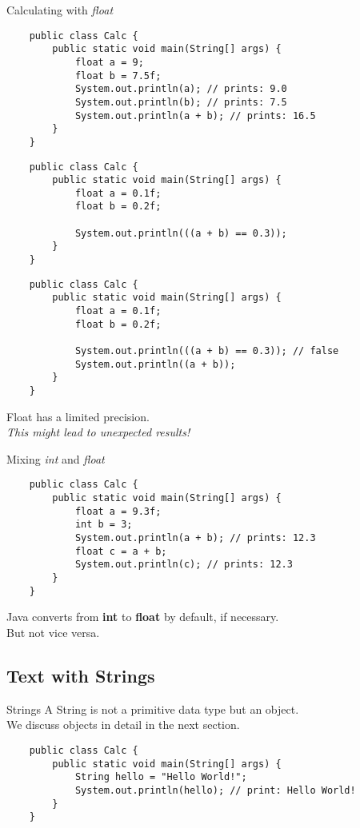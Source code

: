 \begin{frame}{Calculating with \emph{float}}
	\begin{lstlisting}
	public class Calc {
	    public static void main(String[] args) {
	        float a = 9;
	        float b = 7.5f;
	        System.out.println(a); // prints: 9.0
	        System.out.println(b); // prints: 7.5
	        System.out.println(a + b); // prints: 16.5
	    }
	}
	\end{lstlisting}

\framebreak
\begin{lstlisting}
	public class Calc {
		public static void main(String[] args) {
			float a = 0.1f;
			float b = 0.2f;

			System.out.println(((a + b) == 0.3));
		}
	}
\end{lstlisting}


\framebreak
	\begin{lstlisting}
	public class Calc {
		public static void main(String[] args) {
			float a = 0.1f;
			float b = 0.2f;
			
			System.out.println(((a + b) == 0.3)); // false
			System.out.println((a + b));
		}
	}
	\end{lstlisting}
	Float has a limited precision. \\
	\emph{This might lead to unexpected results!}
\end{frame}

\begin{frame}[fragile]{Mixing \emph{int} and \emph{float}}
	\begin{lstlisting}
	public class Calc {
	    public static void main(String[] args) {
	        float a = 9.3f;
	        int b = 3;
	        System.out.println(a + b); // prints: 12.3
	        float c = a + b;
	        System.out.println(c); // prints: 12.3
	    }
	}
	\end{lstlisting}
	Java converts from \textbf{int} to \textbf{float} by default, if necessary. \\
	But not vice versa.
\end{frame}

\subsection{Text with Strings}

\begin{frame}[fragile]{Strings}
	A String is not a primitive data type but an object. \\
	We discuss objects in detail in the next section.
	\begin{lstlisting}
	public class Calc {
	    public static void main(String[] args) {
	        String hello = "Hello World!";
	        System.out.println(hello); // print: Hello World!
	    }
	}
	\end{lstlisting}
\end{frame}

